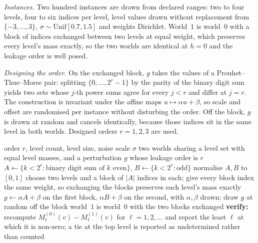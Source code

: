 \documentclass[conference]{IEEEtran}
\theoremstyle{definition}
\begin{document}
\emph{Instances.} Two hundred instances are drawn from declared ranges: two to four levels,
four to six indices per level, level values drawn without replacement from
$\{-3,\dots,3\}$, $\sigma\sim\mathrm{Unif}[0.7,1.5]$ and weights Dirichlet. World~$1$ is
world~$0$ with a block of indices exchanged between two levels at equal weight, which
preserves every level's mass exactly, so the two worlds are identical at $h=0$ and the
leakage order is well posed.

\emph{Designing the order.} On the exchanged block, $g$ takes the values of a
Prouhet--Thue--Morse pair: splitting $\{0,\dots,2^{r}-1\}$ by the parity of the binary digit
sum yields two sets whose $j$-th power sums agree for every $j<r$ and differ at $j=r$. The
construction is invariant under the affine maps $u\mapsto\alpha u+\beta$, so scale and offset
are randomised per instance without disturbing the order. Off the block, $g$ is drawn at
random and cancels identically, because those indices sit in the same level in both worlds.
Designed orders $r=1,2,3$ are used.

\begin{algorithm}[htbp]
\caption{An instance with a designed leakage order $r$}
\label{alg:instance}
\begin{algorithmic}[1]
\REQUIRE order $r$, level count, level size, noise scale $\sigma$
\ENSURE two worlds sharing a level set with equal level masses, and a perturbation $g$ whose
        leakage order is $r$
\STATE $A\leftarrow\{k<2^{r}:\text{binary digit sum of }k\text{ even}\}$,
       $B\leftarrow\{k<2^{r}:\text{odd}\}$
\STATE normalise $A,B$ to $[0,1]$ 
\STATE choose two levels and a block of $|A|$ indices in each; give every block index the
       same weight, so exchanging the blocks preserves each level's mass exactly
\STATE $g\leftarrow\alpha A+\beta$ on the first block, $\alpha B+\beta$ on the second, with
       $\alpha,\beta$ drawn; draw $g$ at random off the block
\STATE world~$1$ is world~$0$ with the two blocks exchanged
\STATE \textbf{verify:} recompute $M^{(0)}_{\ell}(v)-M^{(1)}_{\ell}(v)$ for
       $\ell=1,2,\dots$ and report the least $\ell$ at which it is non-zero; a tie at the top
       level is reported as undetermined rather than counted
\end{algorithmic}
\end{algorithm}
\end{document}
